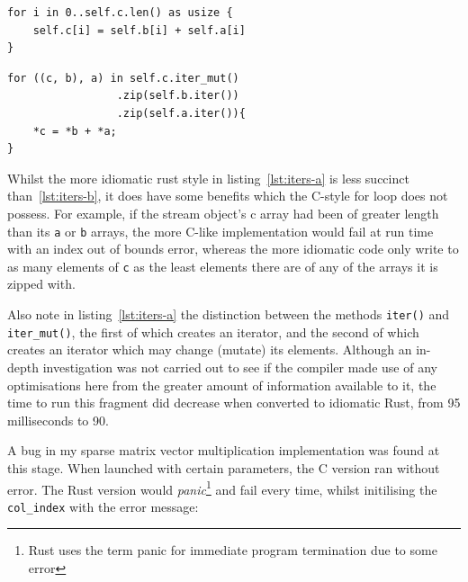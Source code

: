 \noindent\begin{minipage}{.49\textwidth}
    \begin{code}
\begin{verbatim}
for i in 0..self.c.len() as usize {
    self.c[i] = self.b[i] + self.a[i]
}
\end{verbatim}
    \label{lst:iters-b}
\end{code}
\end{minipage}\hfill
\begin{minipage}{.49\textwidth}
    \begin{code}
\begin{verbatim}
for ((c, b), a) in self.c.iter_mut()
                 .zip(self.b.iter())
                 .zip(self.a.iter()){
    *c = *b + *a;
}
\end{verbatim}
\label{lst:iters-a}
\end{code}
\end{minipage}

Whilst the more idiomatic rust style in listing~\ref{lst:iters-a} is less succinct than~\ref{lst:iters-b}, it does have some benefits which the C-style for loop does not possess. For example, if the stream object's c array had been of greater length than its \texttt{a} or \texttt{b} arrays, the more C-like implementation would fail at run time with an index out of bounds error, whereas the more idiomatic code only write to as many elements of \texttt{c} as the least elements there are of any of the arrays it is zipped with.

Also note in listing~\ref{lst:iters-a} the distinction between the methods \texttt{iter()} and \texttt{iter\_mut()}, the first of which creates an iterator, and the second of which creates an iterator which may change (mutate) its elements. Although an in-depth investigation was not carried out to see if the compiler made use of any optimisations here from the greater amount of information available to it, the time to run this fragment did decrease when converted to idiomatic Rust, from 95 milliseconds to 90.

A bug in my sparse matrix vector multiplication implementation was found at this stage. When launched with certain parameters, the C version ran without error. The Rust version would {\em panic}\footnote{Rust uses the term panic for immediate program termination due to some error} and fail every time, whilst initilising the \texttt{col\_index} with the error message:


